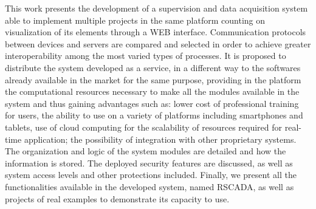 This work presents the development of a supervision and data acquisition system able to implement multiple projects in the same platform counting on visualization of its elements through a WEB interface. Communication protocols between devices and servers are compared and selected in order to achieve greater interoperability among the most varied types of processes. It is proposed to distribute the system developed as a service, in a different way to the softwares already available in the market for the same purpose, providing in the platform the computational resources necessary to make all the modules available in the system and thus gaining advantages such as: lower cost of professional training for users, the ability to use on a variety of platforms including smartphones and tablets, use of cloud computing for the scalability of resources required for real-time application; the possibility of integration with other proprietary systems. The organization and logic of the system modules are detailed and how the information is stored. The deployed security features are discussed, as well as system access levels and other protections included. Finally, we present all the functionalities available in the developed system, named RSCADA, as well as projects of real examples to demonstrate its capacity to use.


